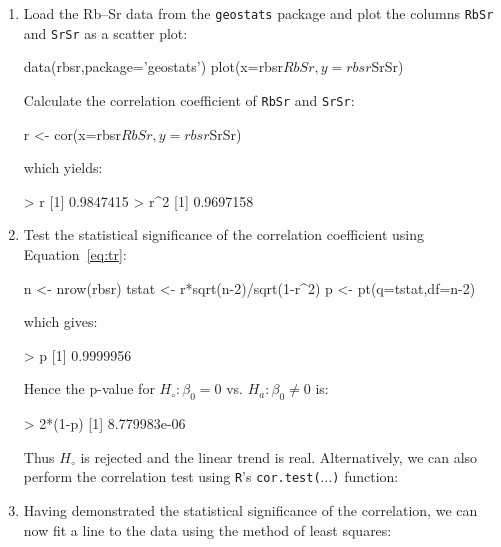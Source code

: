 \begin{enumerate}

\item Load the Rb--Sr data from the \texttt{geostats} package and plot
  the columns \texttt{RbSr} and \texttt{SrSr} as a scatter plot:

\begin{script}
data(rbsr,package='geostats')
plot(x=rbsr$RbSr,y=rbsr$SrSr)
\end{script}

Calculate the correlation coefficient of \texttt{RbSr} and
\texttt{SrSr}:

\begin{script}[firstnumber=3]
r <- cor(x=rbsr$RbSr,y=rbsr$SrSr)
\end{script}

\noindent which yields:

\begin{console}
> r
[1] 0.9847415
> r^2
[1] 0.9697158
\end{console}

\item Test the statistical significance of the correlation coefficient
  using Equation~\ref{eq:tr}:

\begin{script}[firstnumber=4]
n <- nrow(rbsr)
tstat <- r*sqrt(n-2)/sqrt(1-r^2)
p <- pt(q=tstat,df=n-2)
\end{script}

\noindent which gives:

\begin{console}
> p
[1] 0.9999956
\end{console}

Hence the p-value for $H_\circ: \beta_0=0$ vs. $H_a: \beta_0\neq{0}$
is:

\begin{console}
> 2*(1-p)
[1] 8.779983e-06
\end{console}

Thus $H_\circ$ is rejected and the linear trend is
real. Alternatively, we can also perform the correlation test using
\texttt{R}'s \texttt{cor.test($\ldots$)} function:


\item Having demonstrated the statistical significance of the
  correlation, we can now fit a line to the data using the method of
  least squares:


\end{enumerate}
